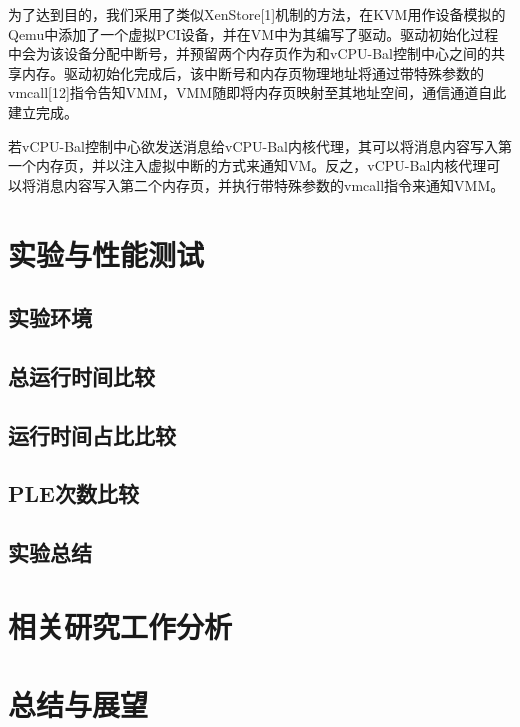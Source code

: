 为了达到目的，我们采用了类似XenStore[1]机制的方法，在KVM用作设备模拟的Qemu中添加了一个虚拟PCI设备，并在VM中为其编写了驱动。驱动初始化过程中会为该设备分配中断号，并预留两个内存页作为和vCPU-Bal控制中心之间的共享内存。驱动初始化完成后，该中断号和内存页物理地址将通过带特殊参数的vmcall[12]指令告知VMM，VMM随即将内存页映射至其地址空间，通信通道自此建立完成。

若vCPU-Bal控制中心欲发送消息给vCPU-Bal内核代理，其可以将消息内容写入第一个内存页，并以注入虚拟中断的方式来通知VM。反之，vCPU-Bal内核代理可以将消息内容写入第二个内存页，并执行带特殊参数的vmcall指令来通知VMM。



\section{实验与性能测试}

\subsection{实验环境}

\subsection{总运行时间比较}

\subsection{运行时间占比比较}

\subsection{PLE次数比较}

\subsection{实验总结}



\section{相关研究工作分析}



\section{总结与展望}